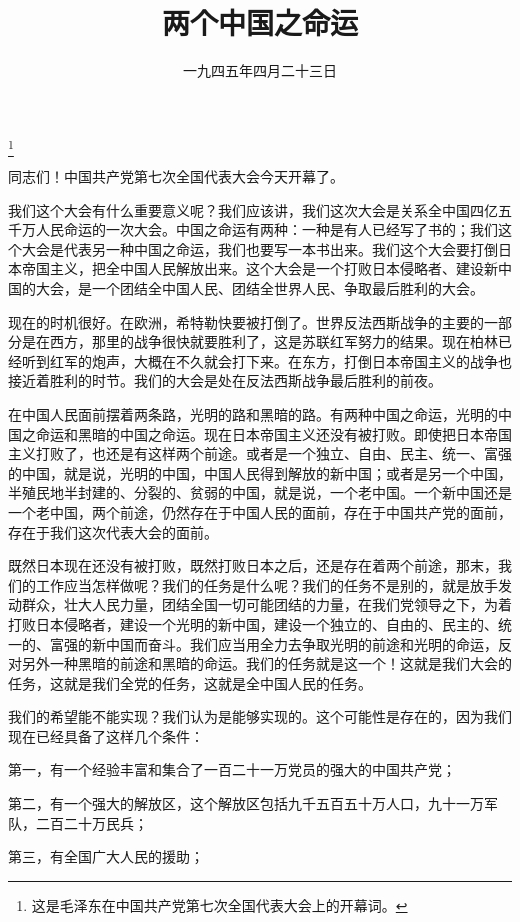 
\title{两个中国之命运}
\date{一九四五年四月二十三日}
\thanks{这是毛泽东在中国共产党第七次全国代表大会上的开幕词。}
\maketitle


同志们！中国共产党第七次全国代表大会今天开幕了。

我们这个大会有什么重要意义呢？我们应该讲，我们这次大会是关系全中国四亿五千万人民命运的一次大会。中国之命运有两种：一种是有人已经写了书的；我们这个大会是代表另一种中国之命运，我们也要写一本书出来。我们这个大会要打倒日本帝国主义，把全中国人民解放出来。这个大会是一个打败日本侵略者、建设新中国的大会，是一个团结全中国人民、团结全世界人民、争取最后胜利的大会。

现在的时机很好。在欧洲，希特勒快要被打倒了。世界反法西斯战争的主要的一部分是在西方，那里的战争很快就要胜利了，这是苏联红军努力的结果。现在柏林已经听到红军的炮声，大概在不久就会打下来。在东方，打倒日本帝国主义的战争也接近着胜利的时节。我们的大会是处在反法西斯战争最后胜利的前夜。

在中国人民面前摆着两条路，光明的路和黑暗的路。有两种中国之命运，光明的中国之命运和黑暗的中国之命运。现在日本帝国主义还没有被打败。即使把日本帝国主义打败了，也还是有这样两个前途。或者是一个独立、自由、民主、统一、富强的中国，就是说，光明的中国，中国人民得到解放的新中国；或者是另一个中国，半殖民地半封建的、分裂的、贫弱的中国，就是说，一个老中国。一个新中国还是一个老中国，两个前途，仍然存在于中国人民的面前，存在于中国共产党的面前，存在于我们这次代表大会的面前。

既然日本现在还没有被打败，既然打败日本之后，还是存在着两个前途，那末，我们的工作应当怎样做呢？我们的任务是什么呢？我们的任务不是别的，就是放手发动群众，壮大人民力量，团结全国一切可能团结的力量，在我们党领导之下，为着打败日本侵略者，建设一个光明的新中国，建设一个独立的、自由的、民主的、统一的、富强的新中国而奋斗。我们应当用全力去争取光明的前途和光明的命运，反对另外一种黑暗的前途和黑暗的命运。我们的任务就是这一个！这就是我们大会的任务，这就是我们全党的任务，这就是全中国人民的任务。

我们的希望能不能实现？我们认为是能够实现的。这个可能性是存在的，因为我们现在已经具备了这样几个条件：

第一，有一个经验丰富和集合了一百二十一万党员的强大的中国共产党；

第二，有一个强大的解放区，这个解放区包括九千五百五十万人口，九十一万军队，二百二十万民兵；

第三，有全国广大人民的援助；

